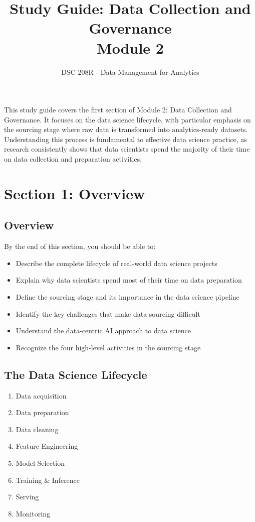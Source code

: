 \documentclass[12pt]{article}
\title{Study Guide: Data Collection and Governance\\Module 2}
\author{DSC 208R - Data Management for Analytics}
\date{}
\begin{document}
\maketitle

\begin{tcolorbox}[colback=blue!5!white,colframe=blue!75!black,title={Section 1: Overview}]
This study guide covers the first section of Module 2: Data Collection and Governance. It focuses on the data science lifecycle, with particular emphasis on the sourcing stage where raw data is transformed into analytics-ready datasets. Understanding this process is fundamental to effective data science practice, as research consistently shows that data scientists spend the majority of their time on data collection and preparation activities.
\end{tcolorbox}

\section{Section 1: Overview}

\subsection{Overview}

By the end of this section, you should be able to:

\begin{itemize}
    \item Describe the complete lifecycle of real-world data science projects
    \item Explain why data scientists spend most of their time on data preparation
    \item Define the sourcing stage and its importance in the data science pipeline
    \item Identify the key challenges that make data sourcing difficult
    \item Understand the data-centric AI approach to data science
    \item Recognize the four high-level activities in the sourcing stage
\end{itemize}

\subsection{The Data Science Lifecycle}

\begin{tcolorbox}[colback=green!5!white,colframe=green!75!black,title={Data Science Lifecycle Steps}]
\begin{enumerate}
    \item Data acquisition
    \item Data preparation
    \item Data cleaning
    \item Feature Engineering
    \item Model Selection
    \item Training \& Inference
    \item Serving
    \item Monitoring
\end{enumerate}
\end{tcolorbox}
\end{document}
